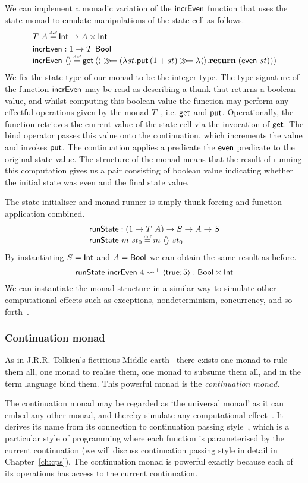 \documentclass[12pt,phd,lfcs,twoside,openright,logo,leftchapter,normalheadings]{infthesis}
\theoremstyle{plain}
\theoremstyle{definition}
\begin{document}
We can implement a monadic variation of the $\mathsf{incrEven}$ function that
uses the state monad to emulate manipulations of the state cell as
follows.
%
\[
  \bl
    T~A \defas \Int \to A \times \Int\smallskip\\
    \incrEven : \UnitType \to T~\Bool\\
    \incrEven~\Unit \defas \getF\,\Unit
      \bind (\lambda st.
           \putF\,(1+st)
           \bind \lambda\Unit. \Return\;(\even~st)))
  \el
\]
%
We fix the state type of our monad to be the integer type.  The type
signature of the function $\mathsf{incrEven}$ may be read as describing a
thunk that returns a boolean value, and whilst computing this boolean
value the function may perform any effectful operations given by the
monad $T$~\cite{Moggi91,Wadler92}, i.e. $\mathsf{get}$ and
$\mathsf{put}$. Operationally, the function retrieves the current value of
the state cell via the invocation of $\mathsf{get}$. The bind operator passes
this value onto the continuation, which increments the value and
invokes $\mathsf{put}$. The continuation applies a predicate the $\mathsf{even}$
predicate to the original state value. The structure of the monad
means that the result of running this computation gives us a pair
consisting of boolean value indicating whether the initial state was
even and the final state value.

The state initialiser and monad runner is simply thunk forcing and
function application combined.
%
\[
  \bl
    \runState : (\UnitType \to T~A) \to S \to A \to S\\
    \runState~m~st_0 \defas m~\Unit~st_0\\
   \el
\]
%
By instantiating $S = \mathsf{Int}$ and $A = \mathsf{Bool}$ we can obtain the same
result as before.
%
\[
  \mathsf{runState}~\mathsf{incrEven}~4 \leadsto^+ \langle \mathsf{true};5 \rangle : \mathsf{Bool} \times \mathsf{Int}
\]
%
We can instantiate the monad structure in a similar way to simulate
other computational effects such as exceptions, nondeterminism,
concurrency, and so forth~\cite{Moggi91,Wadler92}.

\subsubsection{Continuation monad}
As in J.R.R. Tolkien's fictitious Middle-earth~\cite{Tolkien54} there
exists one monad to rule them all, one monad to realise them, one
monad to subsume them all, and in the term language bind them. This
powerful monad is the \emph{continuation monad}.

The continuation monad may be regarded as `the universal monad' as it
can embed any other monad, and thereby simulate any computational
effect~\cite{Filinski99}. It derives its name from its connection to
continuation passing style~\cite{Wadler92}, which is a particular
style of programming where each function is parameterised by the
current continuation (we will discuss continuation passing style in
detail in Chapter~\ref{ch:cps}). The continuation monad is powerful
exactly because each of its operations has access to the current
continuation.
\end{document}
